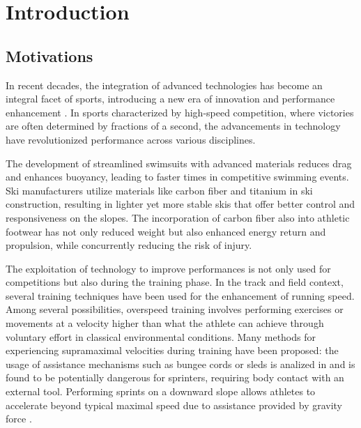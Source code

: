 \documentclass[a4paper,12pt,oneside]{book}
\begin{document}

\chapter*{Introduction}
	
\section*{Motivations}

In recent decades, the integration of advanced technologies has become an integral facet of sports, introducing a new era of innovation and performance enhancement \cite{Technology_athletics}. 
In sports characterized by high-speed competition, where victories are often determined by fractions of a second, the advancements in technology have revolutionized performance across various disciplines. 
\bigskip

The development of streamlined swimsuits with advanced materials reduces drag and enhances buoyancy, leading to faster times in competitive swimming events.
Ski manufacturers utilize materials like carbon fiber and titanium in ski construction, resulting in lighter yet more stable skis that offer better control and responsiveness on the slopes.
The incorporation of carbon fiber also into athletic footwear has not only reduced weight but also enhanced energy return and propulsion, while concurrently reducing the risk of injury.
\bigskip

The exploitation of technology to improve performances is not only used for competitions but also during the training phase. 
In the track and field context, several training techniques have been used for the enhancement of running speed. 
Among several possibilities, overspeed training involves performing exercises or movements at a velocity higher than what the athlete can achieve through voluntary effort in classical environmental conditions. 
Many methods for experiencing supramaximal velocities during training have been proposed: the usage of assistance mechanisms such as bungee cords or sleds is analized in \cite{Elastic_cord} and is found to be potentially dangerous for sprinters, requiring body contact with an external tool.
Performing sprints on a downward slope allows athletes to accelerate beyond typical maximal speed due to assistance provided by gravity force \cite{Hill_slope}.
\bigskip
\end{document}

